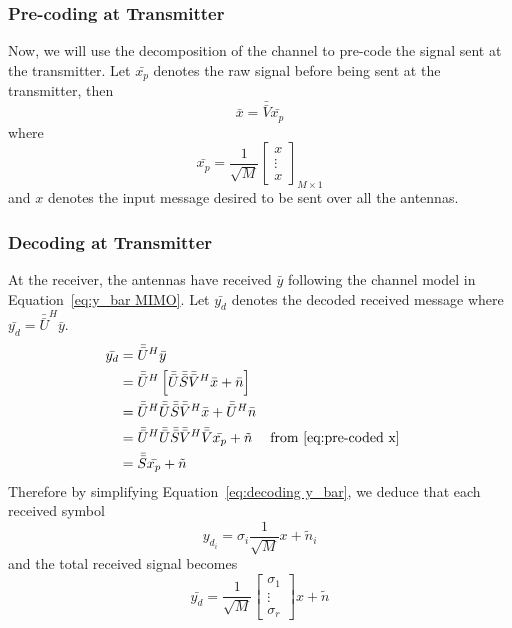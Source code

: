 \subsubsection{Pre-coding at Transmitter}
Now, we will use the decomposition of the channel to pre-code the signal sent at the transmitter. Let $\bar{x_p}$ denotes the raw signal before being sent at the transmitter, then 
\begin{equation}
    \label{eq:pre-coded x}
    \bar{x} = \bar{\bar{V}} \bar{x_p}
\end{equation}
where
\[ \bar{x_p} = \frac{1}{\sqrt{M}} \left[ \begin{array}{c}
    x \\
    \vdots \\
    x
\end{array} \right]_{M \times 1} \]
and $x$ denotes the input message desired to be sent over all the antennas.

\subsubsection{Decoding at Transmitter}
At the receiver, the antennas have received $\bar{y}$ following the channel model in Equation~\ref{eq:y_bar MIMO}. Let $\bar{y_d}$ denotes the decoded received message where $\bar{y_d} = \bar{\bar{U}}^H \bar{y}$.
\begin{equation}
    \label{eq:decoding y_bar}
    \begin{aligned}
        \bar{y_d} &= \bar{\bar{U}}^H \bar{y} \\
        &= \bar{\bar{U}}^H \left[ \bar{\bar{U}} \bar{\bar{S}} \bar{\bar{V}}^H \bar{x} + \bar{n} \right] \\
        &= \bar{\bar{U}}^H \bar{\bar{U}} \bar{\bar{S}} \bar{\bar{V}}^H \bar{x} + \bar{\bar{U}}^H \bar{n} \\
        &= \bar{\bar{U}}^H \bar{\bar{U}} \bar{\bar{S}} \bar{\bar{V}}^H \bar{\bar{V}} \bar{x_p} + \tilde{n} && \text{from \ref{eq:pre-coded x}} \\
        &= \bar{\bar{S}} \bar{x_p} + \tilde{n}
    \end{aligned}
\end{equation}
Therefore by simplifying Equation~\ref{eq:decoding y_bar}, we deduce that each received symbol
\[ y_{d_i} = \sigma_i \frac{1}{\sqrt{M}} x + \tilde{n}_i \]
and the total received signal becomes
\begin{equation}
    \label{eq:y for mimo div}
    \bar{y_d} =  \frac{1}{\sqrt{M}} \left[ \begin{array}{c}
        \sigma_1 \\
        \vdots \\
        \sigma_r
    \end{array} \right] x + \tilde{n}
\end{equation}

